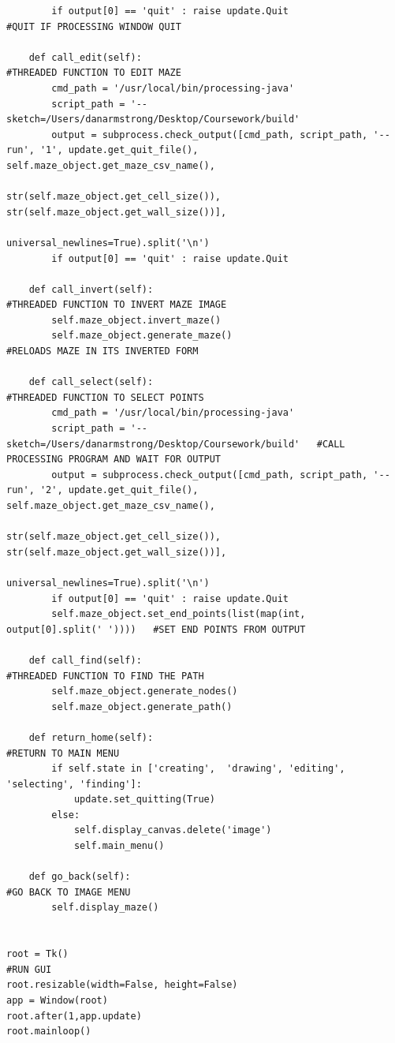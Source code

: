 \documentclass[titlepage]{article}
\begin{document}
\begin{changemargin}{-1in}{-1in}
\begin{verbatim}
        if output[0] == 'quit' : raise update.Quit                              #QUIT IF PROCESSING WINDOW QUIT

    def call_edit(self):                                                        #THREADED FUNCTION TO EDIT MAZE
        cmd_path = '/usr/local/bin/processing-java'
        script_path = '--sketch=/Users/danarmstrong/Desktop/Coursework/build'
        output = subprocess.check_output([cmd_path, script_path, '--run', '1', update.get_quit_file(), self.maze_object.get_maze_csv_name(),
                                          str(self.maze_object.get_cell_size()), str(self.maze_object.get_wall_size())],
                                          universal_newlines=True).split('\n')
        if output[0] == 'quit' : raise update.Quit

    def call_invert(self):                                                      #THREADED FUNCTION TO INVERT MAZE IMAGE
        self.maze_object.invert_maze()
        self.maze_object.generate_maze()                                        #RELOADS MAZE IN ITS INVERTED FORM

    def call_select(self):                                                      #THREADED FUNCTION TO SELECT POINTS
        cmd_path = '/usr/local/bin/processing-java'
        script_path = '--sketch=/Users/danarmstrong/Desktop/Coursework/build'   #CALL PROCESSING PROGRAM AND WAIT FOR OUTPUT
        output = subprocess.check_output([cmd_path, script_path, '--run', '2', update.get_quit_file(), self.maze_object.get_maze_csv_name(),
                                          str(self.maze_object.get_cell_size()), str(self.maze_object.get_wall_size())],
                                          universal_newlines=True).split('\n')
        if output[0] == 'quit' : raise update.Quit
        self.maze_object.set_end_points(list(map(int, output[0].split(' '))))   #SET END POINTS FROM OUTPUT

    def call_find(self):                                                        #THREADED FUNCTION TO FIND THE PATH
        self.maze_object.generate_nodes()
        self.maze_object.generate_path()

    def return_home(self):                                                      #RETURN TO MAIN MENU
        if self.state in ['creating',  'drawing', 'editing', 'selecting', 'finding']:
            update.set_quitting(True)
        else:
            self.display_canvas.delete('image')
            self.main_menu()

    def go_back(self):                                                          #GO BACK TO IMAGE MENU
        self.display_maze()
    

root = Tk()                                                                     #RUN GUI 
root.resizable(width=False, height=False)
app = Window(root)
root.after(1,app.update)
root.mainloop()
\end{verbatim}
\end{changemargin} 
\end{document}
